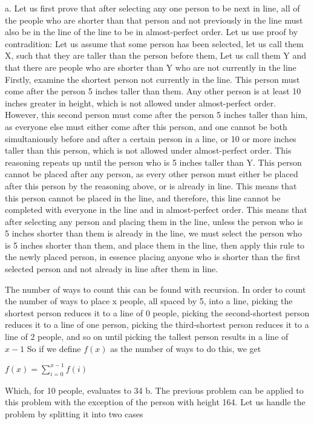 \documentclass[11pt]{article}
\begin{document}
\begin{solution}{3} %
a.
Let us first prove that after selecting any one person to be next in line, all 
of the people who are shorter than that person and not previously in the line
must also be in the line of the line to be in almost-perfect order.
Let us use proof by contradition: 
Let us assume that some person has been selected, let us call them X, such that 
they are taller than the person before them, Let us call them Y and that
there are people who are shorter than Y who are not currently in the line
Firstly, examine the shortest person not currently in the line. This person must 
come after the person 5 inches taller than them. Any other person is at least
10 inches greater in height, which is not allowed under almost-perfect order. 
However, this second person must come after the person 5 inches taller than him,
as everyone else must either come after this person, and one cannot be both 
simultaniously before and after a certain person in a line, 
or 10 or more inches taller than this person, which is not allowed under 
almost-perfect order. This reasoning repeats up until the person who is
5 inches taller than Y. This person cannot be placed after any person, as every 
other person must either be placed after this person by the reasoning above, or 
is already in line.
This means that this person cannot be placed in the line, and therefore, this 
line cannot be completed with everyone in the line and in almost-perfect
order. This means that after selecting any person and placing them in the line, 
unless the person who is 5 inches shorter than them is already in the line, we 
must select the person who is 5 inches shorter than them, and place them in the 
line, then apply this rule to the newly placed person, in essence placing anyone
who is shorter than the first selected person and not already in line after them in line.


The number of ways to count this can be found with recursion. In order to count the number of ways to place x people, all spaced by 5, into a line,
picking the shortest person reduces it to a line of 0 people, picking the second-shortest person reduces it to a line of one person, picking the third-shortest person reduces it to a line of 2 people, and so on until picking the tallest person results in a line of $x-1$
So if we define $f(x)$ as the number of ways to do this, we get

$
f(x) = \sum\limits_{i = 0}^{x-1} f(i)
$

Which, for 10 people, evaluates to 34
b.
The previous problem can be applied to this problem with the exception of the 
person with height 164. Let us handle the problem
by splitting it into two cases


\end{solution}
\end{document}
